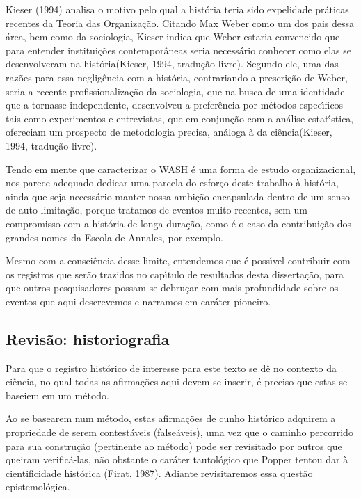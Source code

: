 \documentclass[
12pt,		%
openright,	%
twoside,  %
a4paper,			%
chapter=TITLE,		%
english,			%
french,				%
spanish,			%
brazil				%
]{USPSC-classe/USPSC}
\begin{document}
 Kieser (1994)  analisa o motivo pelo qual a hist\'oria teria sido \textquotedbl expelida\textquotedbl  de pr\'aticas recentes da Teoria das Organiza\c{c}\~ao. Citando Max Weber como um dos pais dessa \'area, bem como da sociologia, Kieser indica que Weber estaria \textquotedbl convencido que para entender institui\c{c}\~oes contempor\^aneas seria necess\'ario conhecer como elas se desenvolveram na hist\'oria\textquotedbl   (Kieser, 1994, tradu\c{c}\~ao livre). Segundo ele, uma das raz\~oes para essa neglig\^encia com a hist\'oria, contrariando a prescri\c{c}\~ao de Weber, seria a recente profissionaliza\c{c}\~ao da sociologia, que na busca de uma identidade que a tornasse independente, desenvolveu a prefer\^encia por m\'etodos espec\'{\i}ficos tais como experimentos e entrevistas, que \textquotedbl em conjun\c{c}\~ao com a an\'alise estat\'{\i}stica, ofereciam um prospecto de metodologia precisa, an\'aloga \`a da ci\^encia\textquotedbl   (Kieser, 1994, tradu\c{c}\~ao livre).




Tendo em mente que caracterizar o WASH \'e uma forma de estudo organizacional, nos parece adequado dedicar uma parcela do esfor\c{c}o deste trabalho \`a hist\'oria, ainda que seja necess\'ario manter nossa ambi\c{c}\~ao encapsulada dentro de um senso de auto-limita\c{c}\~ao, porque tratamos de eventos muito recentes, sem um compromisso com a hist\'oria de longa dura\c{c}\~ao, como \'e o caso da contribui\c{c}\~ao dos grandes nomes da Escola de Annales, por exemplo.




Mesmo com a consci\^encia desse limite, entendemos que \'e poss\'{\i}vel contribuir com os registros que ser\~ao trazidos no cap\'{\i}tulo de resultados desta disserta\c{c}\~ao, para que outros pesquisadores possam se debru\c{c}ar com mais profundidade sobre os eventos que aqui descrevemos e narramos em car\'ater pioneiro.




\subsection[Revis\~ao: historiografia]{Revis\~ao: historiografia}\label{Revis\~ao: historiografia}
Para que o registro hist\'orico de interesse para este texto se d\^e no contexto da ci\^encia, no qual todas as afirma\c{c}\~oes aqui devem se inserir, \'e preciso que estas se baseiem em um m\'etodo.




Ao se basearem num m\'etodo, estas afirma\c{c}\~oes de cunho hist\'orico adquirem a propriedade de serem contest\'aveis (false\'aveis), uma vez que o caminho percorrido para sua constru\c{c}\~ao (pertinente ao m\'etodo) pode ser revisitado por outros que queiram verific\'a-las, n\~ao obstante o car\'ater tautol\'ogico que Popper tentou dar \`a cientificidade hist\'orica  (Firat, 1987). Adiante revisitaremos essa quest\~ao epistemol\'ogica.
\end{document}
